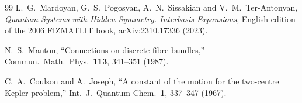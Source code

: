 \documentclass[aps,pra,twocolumn,superscriptaddress,longbibliography]{revtex4-2}
\begin{document}
\begin{thebibliography}{99}
L.~G.~Mardoyan, G.~S.~Pogosyan, A.~N.~Sissakian and V.~M.~Ter-Antonyan,
\emph{Quantum Systems with Hidden Symmetry. Interbasis Expansions},
English edition of the 2006 FIZMATLIT book, arXiv:2310.17336 (2023).

N.~S.~Manton, ``Connections on discrete fibre bundles,'' Commun.\ Math.\
Phys.\ \textbf{113}, 341--351 (1987).

C.~A.~Coulson and A.~Joseph, ``A constant of the motion for the
two-centre Kepler problem,'' Int.\ J.\ Quantum Chem.\ \textbf{1},
337--347 (1967).

\end{thebibliography}
\end{document}
